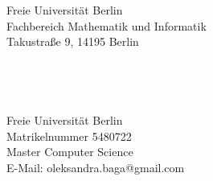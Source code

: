 \begin{titlepage}
	\tgherosfont
	\centering




    {\normalsize Freie Universität Berlin}\\
    {\normalsize Fachbereich Mathematik und Informatik}\\
    {\normalsize Takustraße 9, 14195 Berlin}\\[30mm]
	{\LARGE \color{ctcolortitle}\textbf{\thesisTitle}}\\[20mm]
	{\color{ctcolortitle}\textbf{\thesisTitleEng}}\\[10mm]
	{\color{ctcolortitle}\textbf{\thesisTitleDe}}\\[20mm]


	
	{\LARGE \thesisName} \\[5mm]
	    {\normalsize Freie Universität Berlin} \\
    {\normalsize Matrikelnummer 5480722} \\
	{\normalsize Master Computer Science} \\
	{\small E-Mail: oleksandra.baga@gmail.com} \\[20mm]


	\vfill
	
	\hspace*{15pt}
	\begin{minipage}[t]{.65\textwidth}
		\centering
		{\large \thesisFirstReviewer} \\
	  	{\small \thesisFirstReviewerDepartment} \\[-1mm]
		{\small \thesisFirstReviewerUniversity}
			\hspace*{15pt}
	\end{minipage} \\[15mm]

\hspace*{15pt}
\begin{minipage}[t]{.65\textwidth}
	\centering
	{\large \thesisSecondReviewer} \\
	{\small \thesisSecondReviewerDepartment} \\[-1mm]
	{\small \thesisSecondReviewerUniversity}
	
\end{minipage} \\[5mm]

\end{titlepage}
